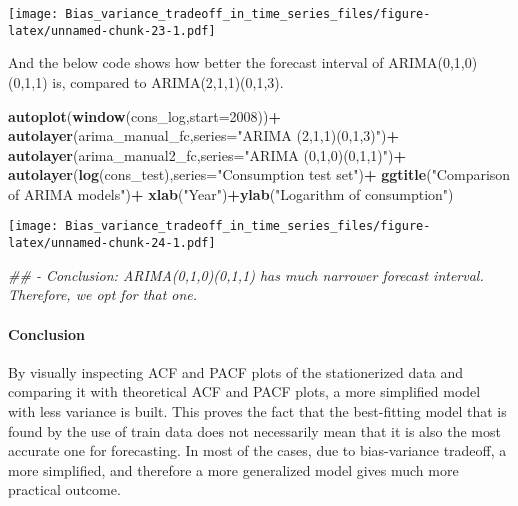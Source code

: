 \documentclass[
]{article}
\newenvironment{Shaded}{\begin{snugshade}}{\end{snugshade}}
\newcommand{\CommentTok}[1]{\textcolor[rgb]{0.56,0.35,0.01}{\textit{#1}}}
\newcommand{\DataTypeTok}[1]{\textcolor[rgb]{0.13,0.29,0.53}{#1}}
\newcommand{\DecValTok}[1]{\textcolor[rgb]{0.00,0.00,0.81}{#1}}
\newcommand{\KeywordTok}[1]{\textcolor[rgb]{0.13,0.29,0.53}{\textbf{#1}}}
\newcommand{\NormalTok}[1]{#1}
\newcommand{\OperatorTok}[1]{\textcolor[rgb]{0.81,0.36,0.00}{\textbf{#1}}}
\newcommand{\StringTok}[1]{\textcolor[rgb]{0.31,0.60,0.02}{#1}}
\begin{document}
\texttt{[image: Bias\_variance\_tradeoff\_in\_time\_series\_files/figure-latex/unnamed-chunk-23-1.pdf]}

And the below code shows how better the forecast interval of
ARIMA(0,1,0)(0,1,1) is, compared to ARIMA(2,1,1)(0,1,3).

\begin{Shaded}
\begin{Highlighting}[]
\KeywordTok{autoplot}\NormalTok{(}\KeywordTok{window}\NormalTok{(cons_log,}\DataTypeTok{start=}\DecValTok{2008}\NormalTok{))}\OperatorTok{+}
\StringTok{  }\KeywordTok{autolayer}\NormalTok{(arima_manual_fc,}\DataTypeTok{series=}\StringTok{"ARIMA (2,1,1)(0,1,3)"}\NormalTok{)}\OperatorTok{+}
\StringTok{  }\KeywordTok{autolayer}\NormalTok{(arima_manual2_fc,}\DataTypeTok{series=}\StringTok{"ARIMA (0,1,0)(0,1,1)"}\NormalTok{)}\OperatorTok{+}
\StringTok{  }\KeywordTok{autolayer}\NormalTok{(}\KeywordTok{log}\NormalTok{(cons_test),}\DataTypeTok{series=}\StringTok{"Consumption test set"}\NormalTok{)}\OperatorTok{+}
\StringTok{  }\KeywordTok{ggtitle}\NormalTok{(}\StringTok{"Comparison of ARIMA models"}\NormalTok{)}\OperatorTok{+}
\StringTok{  }\KeywordTok{xlab}\NormalTok{(}\StringTok{"Year"}\NormalTok{)}\OperatorTok{+}\KeywordTok{ylab}\NormalTok{(}\StringTok{"Logarithm of consumption"}\NormalTok{)}
\end{Highlighting}
\end{Shaded}

\texttt{[image: Bias\_variance\_tradeoff\_in\_time\_series\_files/figure-latex/unnamed-chunk-24-1.pdf]}

\begin{Shaded}
\begin{Highlighting}[]
\CommentTok{## - Conclusion: ARIMA(0,1,0)(0,1,1) has much narrower forecast interval. Therefore, we opt for that one.}
\end{Highlighting}
\end{Shaded}

\hypertarget{conclusion}{%
\paragraph{Conclusion}\label{conclusion}}

By visually inspecting ACF and PACF plots of the stationerized data and
comparing it with theoretical ACF and PACF plots, a more simplified
model with less variance is built. This proves the fact that the
best-fitting model that is found by the use of train data does not
necessarily mean that it is also the most accurate one for forecasting.
In most of the cases, due to bias-variance tradeoff, a more simplified,
and therefore a more generalized model gives much more practical
outcome.
\end{document}
